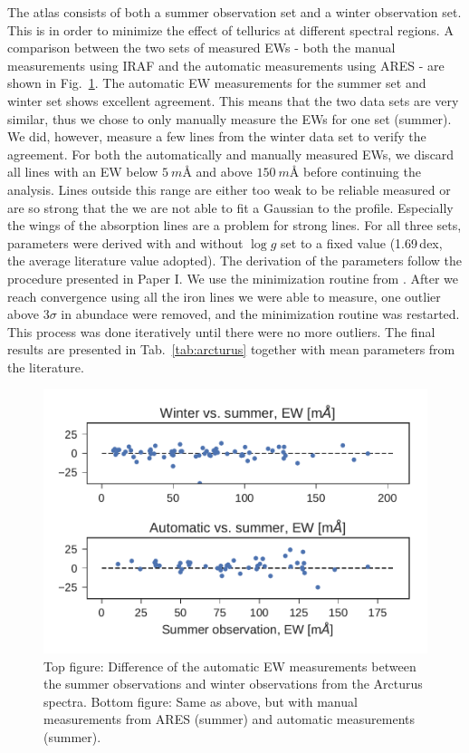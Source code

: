 \documentclass{aa}
\begin{document}
The atlas consists of both a summer observation set and a winter observation
set. This is in order to minimize the effect of tellurics at different spectral
regions. A comparison between the two sets of measured EWs - both the manual
measurements using IRAF and the automatic measurements using ARES - are shown in
Fig.~\ref{fig:EWcomp}. The automatic EW measurements for the summer set and
winter set shows excellent agreement. This means that the two data sets are very
similar, thus we chose to only manually measure the EWs for one set (summer). We
did, however, measure a few lines from the winter data set to verify the
agreement. For both the automatically and manually measured EWs, we discard all
lines with an EW below $\SI{5}{m}$\AA{} and above $\SI{150}{m}$\AA{} before
continuing the analysis. Lines outside this range are either too weak to be
reliable measured or are so strong that the we are not able to fit a Gaussian to
the profile. Especially the wings of the absorption lines are a problem for
strong lines. For all three sets, parameters were derived with and without $\log
g$ set to a fixed value (1.69\,dex, the average literature value adopted). The
derivation of the parameters follow the procedure presented in Paper I. We use
the minimization routine from \citet{Andreasen2017a}. After we reach convergence
using all the iron lines we were able to measure, one outlier above $3\sigma$ in
abundace were removed, and the minimization routine was restarted. This process
was done iteratively until there were no more outliers. The final results are
presented in Tab.~\ref{tab:arcturus} together with mean parameters from the
literature.


\begin{figure}[htpb!]
    \centering
    \includegraphics[width=1.0\linewidth]{figures/EWcomp.pdf}
    \caption{Top figure: Difference of the automatic EW measurements between the
             summer observations and winter observations from the Arcturus
             spectra. Bottom figure: Same as above, but with manual
             measurements from ARES (summer) and automatic measurements (summer).}
    \label{fig:EWcomp}
\end{figure}
\end{document}
